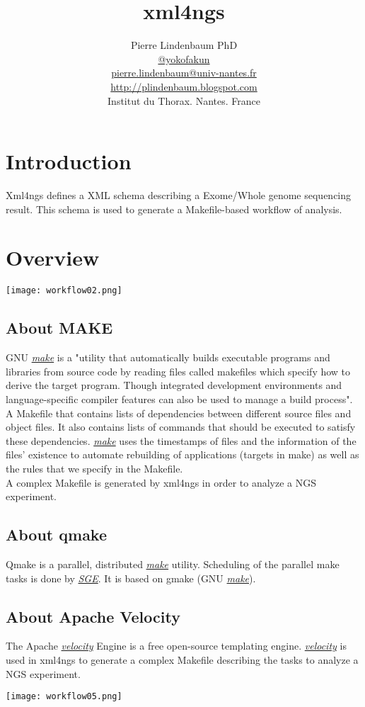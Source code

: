 \documentclass{article}
\author{Pierre Lindenbaum PhD\\\href{https://twitter.com/yokofakun}{@yokofakun}\\ \href{mailto:plindenbaum@yahoo.fr}{pierre.lindenbaum@univ-nantes.fr}\\ \url{http://plindenbaum.blogspot.com}\\Institut du Thorax. Nantes. France}
\title{xml4ngs}
\date{}
\newcommand{\sge}{\href{http://gridscheduler.sourceforge.net}{\em{SGE}}}
\newcommand{\make}{\href{http://www.gnu.org/software/make/manual/make.html}{\em{make}}}
\newcommand{\velocity}{\href{http://velocity.apache.org/}{\em{velocity}}}
\begin{document}
\maketitle

\section{Introduction}

Xml4ngs defines a XML schema describing a Exome/Whole genome sequencing result. This schema
is used to generate a Makefile-based workflow of analysis.

\section{Overview}
\begin{center}
\texttt{[image: workflow02.png]}
\end{center}

\subsection{About MAKE}
GNU \make{}  is a "utility that automatically builds executable programs and libraries from source code by reading files called makefiles which specify how to derive the target program. Though integrated development environments and language-specific compiler features can also be used to manage a build process".\\
A Makefile that contains lists of dependencies between different source files and object files. It also contains lists of commands that should be executed to satisfy these dependencies. \make{} uses the timestamps of files and the information of the files' existence to automate rebuilding of applications (targets in make) as well as the rules that we specify in the Makefile.\\
A complex Makefile is generated by xml4ngs in order to analyze a NGS experiment.

\subsection{About qmake}
Qmake is a parallel, distributed \make{} utility. Scheduling of the parallel make tasks is done by \sge{}. It is based on gmake (GNU \make{}).
\subsection{About Apache Velocity}
The Apache \velocity{} Engine is a free open-source templating engine. \velocity{} is used in xml4ngs to generate a complex Makefile describing the tasks to analyze a NGS experiment.
\begin{center}
\texttt{[image: workflow05.png]}
\end{center}
\end{document}
